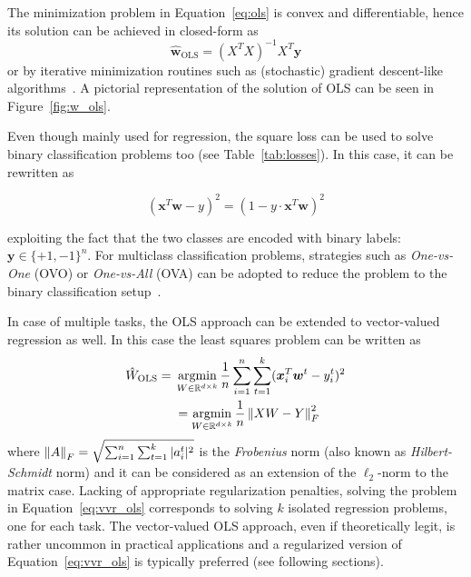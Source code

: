 			The minimization problem in Equation~\eqref{eq:ols} is convex and differentiable, hence its solution can be achieved in closed-form as
			$$
				\bm{\hat w}_{\text{OLS}} = (X^TX)^{-1}X^T\bm{y}
			$$
			or by iterative minimization routines such as (stochastic) gradient descent-like algorithms~\cite{boyd2004convex, sra2012optimization}. A pictorial representation of the solution of OLS can be seen in Figure~\ref{fig:w_ols}.

			Even though mainly used for regression, the square loss can be used to solve binary classification problems too (see Table~\ref{tab:losses}). In this case, it can be rewritten as

			\begin{equation} \label{eq:margin_square_loss}
				(\bm{x}^T\bm{w}-y)^2 = (1-y \cdot \bm{x}^T\bm{w})^2
			\end{equation}

			exploiting the fact that the two classes are encoded with binary labels: $\bm{y} \in \{+1,-1\}^n$. For multiclass classification problems, strategies such as \textit{One-vs-One} (\ac{OVO}) or \textit{One-vs-All} (\ac{OVA}) can be adopted to reduce the problem to the binary classification setup~\cite{hastie2009elements}.

			In case of multiple tasks, the OLS approach can be extended to vector-valued regression as well. In this case the least squares problem can be written as
			\begin{equation} \label{eq:vvr_ols}
				\begin{aligned}
				\hat W_{\text{OLS}}={} & \mathop{\mathrm{argmin}}\limits_{W \in \mathbb{R}^{d \times k}} \frac{1}{n} \sum_{i=1}^n \sum_{t=1}^k (\bm{x}_i^T\bm{w}^t - y_i^t)^2  \\
				& =	\mathop{\mathrm{argmin}}\limits_{W \in \mathbb{R}^{d \times k}} \frac{1}{n} \left\lVert XW - Y\right\rVert_F^2
				\end{aligned}
			\end{equation}
			where $\left\lVert A\right\rVert_F= \sqrt{\sum_{i=1}^n\sum_{t=1}^k |a_i^t|^2}$ is the \textit{Frobenius} norm (also known as  \textit{Hilbert-Schmidt} norm) and it can be considered as an extension of the $\ell_2$-norm to the matrix case.
			Lacking of appropriate regularization penalties, solving the problem in Equation~\eqref{eq:vvr_ols} corresponds to solving $k$ isolated regression problems, one for each task.
			The vector-valued OLS approach, even if theoretically legit, is rather uncommon in practical applications and a regularized version of Equation~\eqref{eq:vvr_ols} is typically preferred (see following sections).

